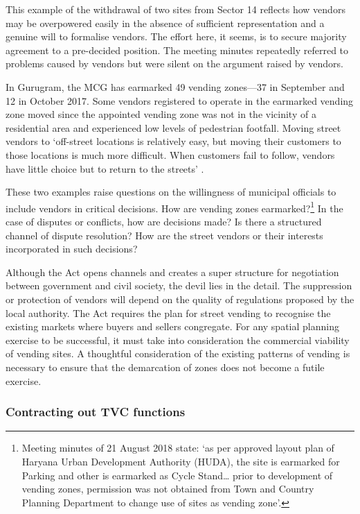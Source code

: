 \documentclass[a4paper, 12pt, twoside, table]{article}
\begin{document}
{{This example of the withdrawal of two sites from Sector 14 reflects how vendors may be overpowered easily in the absence of sufficient representation and a genuine will to formalise vendors. The effort here, it seems, is to secure majority agreement to a pre-decided position. The meeting minutes repeatedly referred to problems caused by vendors but were silent on the argument raised by vendors.

In Gurugram, the MCG has earmarked 49 vending zones—37 in September and 12 in October 2017. Some vendors registered to operate in the earmarked vending zone moved since the appointed vending zone was not in the vicinity of a residential area and experienced low levels of pedestrian footfall. Moving street vendors to `off-street locations is relatively easy, but moving their customers to those locations is much more difficult. When customers fail to follow, vendors have little choice but to return to the streets' \parencite{bromleypaper}.

These two examples raise questions on the willingness of municipal officials to include vendors in critical decisions. How are vending zones earmarked?\footnote{ Meeting minutes of 21 August 2018 state: `as per approved layout plan of Haryana Urban Development Authority (HUDA), the site is earmarked for Parking and other is earmarked as Cycle Stand… prior to development of vending zones, permission was not obtained from Town and Country Planning Department to change use of sites as vending zone'.} In the case of disputes or conflicts, how are decisions made? Is there a structured channel of dispute resolution? How are the street vendors or their interests incorporated in such decisions?

Although the Act opens channels and creates a super structure for negotiation between government and civil society, the devil lies in the detail. The suppression or protection of vendors will depend on the quality of regulations proposed by the local authority. The Act requires the plan for street vending to recognise the existing markets where buyers and sellers congregate. For any spatial planning exercise to be successful, it must take into consideration the commercial viability of vending sites. A thoughtful consideration of the existing patterns of vending is necessary to ensure that the demarcation of zones does not become a futile exercise.


\subsubsection*{Contracting out TVC functions}

}}
\end{document}
